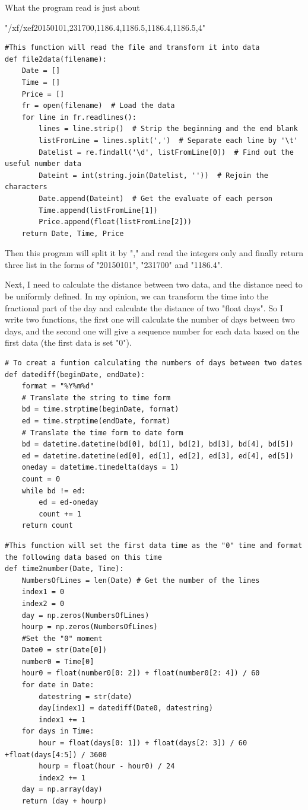 \documentclass[12pt]{article}
\begin{document}
What the program read is just about 

"/xf/xef20150101,231700,1186.4,1186.5,1186.4,1186.5,4"

\begin{lstlisting}
#This function will read the file and transform it into data
def file2data(filename):
    Date = []
    Time = []
    Price = []
    fr = open(filename)  # Load the data
    for line in fr.readlines():
        lines = line.strip()  # Strip the beginning and the end blank
        listFromLine = lines.split(',')  # Separate each line by '\t'
        Datelist = re.findall('\d', listFromLine[0])  # Find out the useful number data
        Dateint = int(string.join(Datelist, ''))  # Rejoin the characters
        Date.append(Dateint)  # Get the evaluate of each person
        Time.append(listFromLine[1])
        Price.append(float(listFromLine[2]))
    return Date, Time, Price
\end{lstlisting}

Then this program will split it by "," and read the integers only and finally return three list in the forms of "20150101", "231700" and "1186.4".

Next, I need to calculate the distance between two data, and the distance need to be uniformly defined. In my opinion, we can transform the time into the fractional part of the day and calculate the distance of two "float days". So I write two functions, the first one will calculate the number of days between two days, and the second one will give a sequence number for each data based on the first data (the first data is set "0").
\begin{lstlisting}
# To creat a funtion calculating the numbers of days between two dates
def datediff(beginDate, endDate):
    format = "%Y%m%d"
    # Translate the string to time form
    bd = time.strptime(beginDate, format)
    ed = time.strptime(endDate, format)
    # Translate the time form to date form
    bd = datetime.datetime(bd[0], bd[1], bd[2], bd[3], bd[4], bd[5])
    ed = datetime.datetime(ed[0], ed[1], ed[2], ed[3], ed[4], ed[5])
    oneday = datetime.timedelta(days = 1)
    count = 0
    while bd != ed:
        ed = ed-oneday
        count += 1
    return count
\end{lstlisting}

\begin{lstlisting}
#This function will set the first data time as the "0" time and format the following data based on this time
def time2number(Date, Time):
    NumbersOfLines = len(Date) # Get the number of the lines
    index1 = 0
    index2 = 0
    day = np.zeros(NumbersOfLines)
    hourp = np.zeros(NumbersOfLines)
    #Set the "0" moment
    Date0 = str(Date[0])
    number0 = Time[0]
    hour0 = float(number0[0: 2]) + float(number0[2: 4]) / 60
    for date in Date:
        datestring = str(date)
        day[index1] = datediff(Date0, datestring)
        index1 += 1
    for days in Time:
        hour = float(days[0: 1]) + float(days[2: 3]) / 60 +float(days[4:5]) / 3600
        hourp = float(hour - hour0) / 24
        index2 += 1
    day = np.array(day)
    return (day + hourp)
\end{lstlisting}
\end{document}
